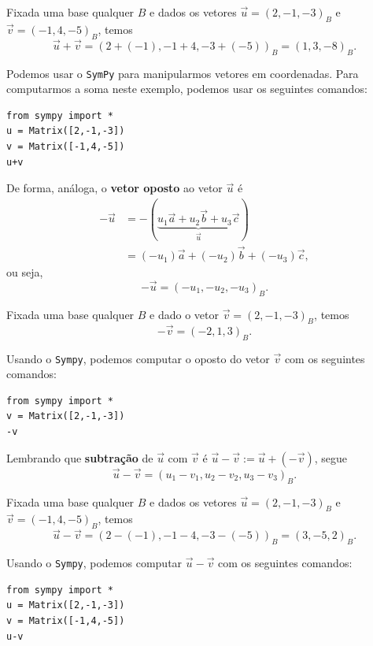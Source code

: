 \begin{ex}
  Fixada uma base qualquer $B$ e dados os vetores $\vec{u} = (2, -1, -3)_B$ e $\vec{v} = (-1, 4, -5)_B$, temos
  \begin{equation}
    \vec{u}+\vec{v} = \left(2+(-1), -1+4, -3+(-5)\right)_B = (1,3,-8)_B.
  \end{equation}

  \ifispython
  Podemos usar o \verb+SymPy+ para manipularmos vetores em coordenadas. Para computarmos a soma neste exemplo, podemos usar os seguintes comandos:
\begin{verbatim}
from sympy import *
u = Matrix([2,-1,-3])
v = Matrix([-1,4,-5])
u+v
\end{verbatim}
  \fi
\end{ex}

De forma, análoga, o {\bf vetor oposto} ao vetor $\vec{u}$ é
\begin{align}
  -\vec{u} &= -(\underbrace{u_1\vec{a} + u_2\vec{b} + u_3\vec{c}}_{\vec{u}})\\
           &= (-u_1)\vec{a} + (-u_2)\vec{b} + (-u_3)\vec{c},
\end{align}
ou seja,
\begin{equation}
  -\vec{u} = (-u_1, -u_2, -u_3)_B.
\end{equation}

\begin{ex}
  Fixada uma base qualquer $B$ e dado o vetor $\vec{v} = (2, -1, -3)_B$, temos
  \begin{equation}
    -\vec{v} = \left(-2, 1, 3\right)_B.
  \end{equation}

  \ifispython
  Usando o \verb+Sympy+, podemos computar o oposto do vetor $\vec{v}$ com os seguintes comandos:
\begin{verbatim}
from sympy import *
v = Matrix([2,-1,-3])
-v
\end{verbatim}
  \fi
\end{ex}


Lembrando que {\bf subtração} de $\vec{u}$ com $\vec{v}$ é $\vec{u}-\vec{v} := \vec{u} + (-\vec{v})$, segue
\begin{equation}
  \vec{u}-\vec{v} = (u_1-v_1, u_2-v_2, u_3-v_3)_B.
\end{equation}

\begin{ex}
  Fixada uma base qualquer $B$ e dados os vetores $\vec{u} = (2, -1, -3)_B$ e $\vec{v} = (-1, 4, -5)_B$, temos
  \begin{equation}
    \vec{u}-\vec{v} = \left(2-(-1), -1-4, -3-(-5)\right)_B = (3,-5,2)_B.
  \end{equation}

  \ifispython
  Usando o \verb+Sympy+, podemos computar $\vec{u}-\vec{v}$ com os seguintes comandos:
\begin{verbatim}
from sympy import *
u = Matrix([2,-1,-3])
v = Matrix([-1,4,-5])
u-v
\end{verbatim}
  \fi
\end{ex}


